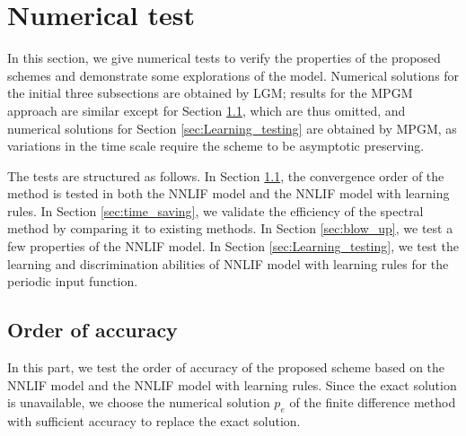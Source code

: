 \section{Numerical test} \label{sec:numerical_test}

In this section, we give  numerical tests to verify the properties of the proposed schemes and demonstrate some explorations of the model. Numerical solutions for the initial three subsections are obtained by LGM; results for the MPGM approach are similar except for Section \ref{sec:Convergence}, which are thus omitted, and numerical solutions for Section \ref{sec:Learning_testing} are obtained by MPGM, as variations in the time scale require the scheme to be asymptotic preserving.

The tests are structured as follows. In Section \ref{sec:Convergence}, the convergence order of the method is tested in both the NNLIF model and the NNLIF model with learning rules. In Section \ref{sec:time_saving}, we validate the efficiency of the spectral method by comparing it to existing methods. In Section \ref{sec:blow_up}, we test a few properties of the NNLIF model. In Section \ref{sec:Learning_testing}, we test the learning and discrimination abilities of NNLIF model with learning rules for the periodic input function.


\subsection{Order of accuracy}\label{sec:Convergence}
In this part, we test the order of accuracy of the proposed scheme based on the NNLIF model and the NNLIF model with learning rules. Since the exact solution is unavailable, we choose the numerical solution $p_e$ of the finite difference method \cite{hu2021structure} with sufficient accuracy to replace the exact solution.



